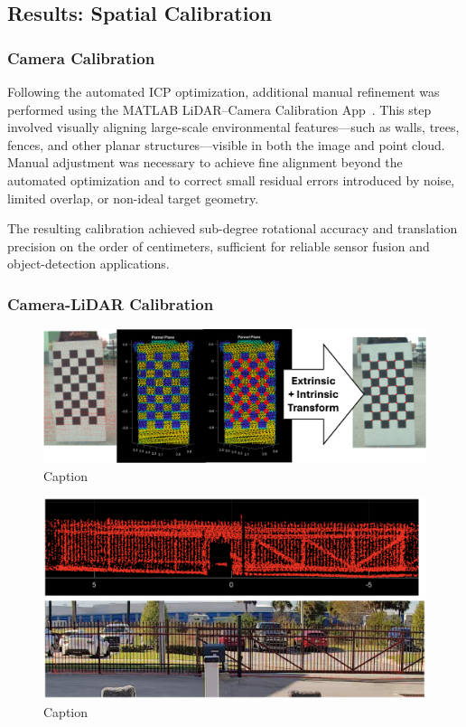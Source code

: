\documentclass{erauthesis}
\begin{document}
\subsection{Results: Spatial Calibration}
\label{sec:spatial_calib_results}

\subsubsection{Camera Calibration} \label{sec:camera_intriniscs_results}

Following the automated ICP optimization, additional manual refinement was performed using the MATLAB LiDAR–Camera Calibration App~\cite{matlab_calibration}.  
This step involved visually aligning large-scale environmental features—such as walls, trees, fences, and other planar structures—visible in both the image and point cloud.  
Manual adjustment was necessary to achieve fine alignment beyond the automated optimization and to correct small residual errors introduced by noise, limited overlap, or non-ideal target geometry.

The resulting calibration achieved sub-degree rotational accuracy and translation precision on the order of centimeters, sufficient for reliable sensor fusion and object-detection applications.

\subsubsection{Camera-LiDAR Calibration} \label{sec:camera-lidar_results}

\begin{figure}[htbp]
    \centering
    \includegraphics[width=0.8\linewidth]{Images/calib_checkers.png}
    \caption{Caption}
    \label{fig:calib_check}
\end{figure}

\begin{figure}[htbp]
    \centering
    \includegraphics[width=0.8\linewidth]{Images/LiDAR_calib_fence.png}
    \caption{Caption}
    \label{fig:calib_fence}
\end{figure}
\end{document}
